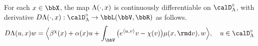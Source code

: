 \begin{lemma}
  \label{lemma:ode-differentiable}
  For each $\stateVar \in \stateSpace$, the map $\Lambda(\cdot,x)$ is continuously differentiable on $\odeSpace^\circ$, with derivative $D\ode(\cdot,\stateVar): \odeSpace^\circ \rightarrow \bbL(\vecSpace, \bbR)$ as follows.
  \begin{equation}
    \label{eq:ode-derivative-truncation}
    D\ode(\momentVar,\stateVar) w = \Bprj{\affDrift^\trunc(\stateVar) + \affDiff(\stateVar)\momentVar + \int_\vecSpace \big( e^\prj{\momentVar}{\markVar} \markVar - \trunc(\markVar)\big) \affJump(\stateVar,\rmd\markVar)}{w}, \quad \momentVar \in \odeSpace^\circ
  \end{equation}
\end{lemma}
